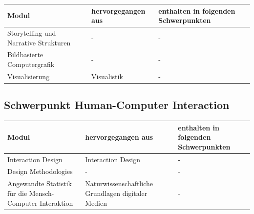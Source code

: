 \begin{longtable}[]{@{}lll@{}}
\toprule
Modul & hervorgegangen aus & enthalten in folgenden
Schwerpunkten\tabularnewline
\midrule
\endhead
Storytelling und Narrative Strukturen & - & -\tabularnewline
Bildbasierte Computergrafik & - & -\tabularnewline
Visualisierung & Visualistik & -\tabularnewline
\bottomrule
\end{longtable}

\subsection{Schwerpunkt Human-Computer
Interaction}\label{schwerpunkt-human-computer-interaction}

\begin{longtable}[]{@{}lll@{}}
\toprule
\begin{minipage}[b]{0.33\columnwidth}\raggedright\strut
Modul\strut
\end{minipage} & \begin{minipage}[b]{0.33\columnwidth}\raggedright\strut
hervorgegangen aus\strut
\end{minipage} & \begin{minipage}[b]{0.33\columnwidth}\raggedright\strut
enthalten in folgenden Schwerpunkten\strut
\end{minipage}\tabularnewline
\midrule
\endhead
\begin{minipage}[t]{0.33\columnwidth}\raggedright\strut
Interaction Design\strut
\end{minipage} & \begin{minipage}[t]{0.33\columnwidth}\raggedright\strut
Interaction Design\strut
\end{minipage} & \begin{minipage}[t]{0.33\columnwidth}\raggedright\strut
-\strut
\end{minipage}\tabularnewline
\begin{minipage}[t]{0.33\columnwidth}\raggedright\strut
Design Methodologies\strut
\end{minipage} & \begin{minipage}[t]{0.33\columnwidth}\raggedright\strut
-\strut
\end{minipage} & \begin{minipage}[t]{0.33\columnwidth}\raggedright\strut
-\strut
\end{minipage}\tabularnewline
\begin{minipage}[t]{0.33\columnwidth}\raggedright\strut
Angewandte Statistik für die Mensch-Computer Interaktion\strut
\end{minipage} & \begin{minipage}[t]{0.33\columnwidth}\raggedright\strut
Naturwissenschaftliche Grundlagen digitaler Medien\strut
\end{minipage} & \begin{minipage}[t]{0.33\columnwidth}\raggedright\strut
-\strut
\end{minipage}\tabularnewline
\bottomrule
\end{longtable}

